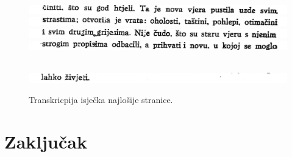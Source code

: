 \documentclass[zavrsnirad]{fer}
\begin{document}
\begin{figure}[H]
\begin{minipage}{0.85\linewidth}
		\vspace{0.5em}
		\includegraphics[width=\linewidth]{Figures/korizmena9/6.png}
	\end{minipage}
	\begin{minipage}{0.85\linewidth}
		\texttt{}
		\vspace{0.5em}
		\includegraphics[width=\linewidth]{Figures/korizmena9/7.png}
	\end{minipage}
	\begin{minipage}{0.85\linewidth}
		\texttt{}
		\vspace{0.5em}
		\includegraphics[width=\linewidth]{Figures/korizmena9/8.png}
	\end{minipage}
	\begin{minipage}{0.85\linewidth}
		\texttt{}
		\vspace{0.5em}
		\includegraphics[width=\linewidth]{Figures/korizmena9/9.png}
	\end{minipage}
	\begin{minipage}{0.85\linewidth}
		\texttt{}
		\vspace{0.5em}\\
		\includegraphics[width=\linewidth]{Figures/korizmena9/10.png}
	\end{minipage}
	\caption{Transkricpija isječka najlošije stranice.}
	\label{fig:compare}
\end{figure}



\chapter{Zaključak}
\label{pog:zakljucak}
\end{document}
